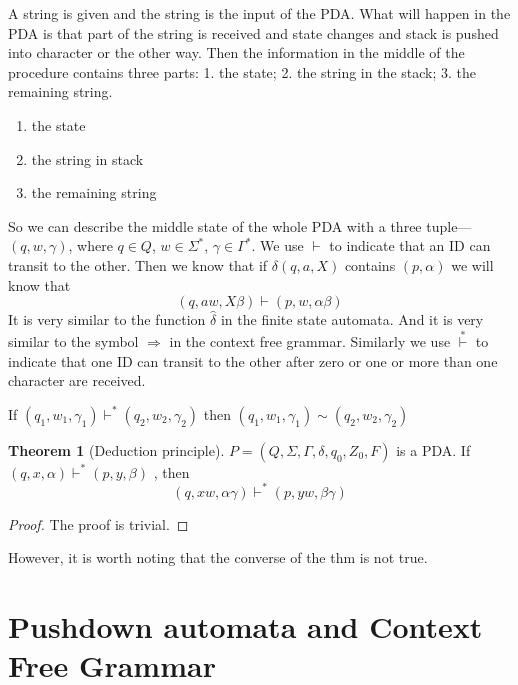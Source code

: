 \documentclass[12pt]{article}
\theoremstyle{definition}
\newtheorem{thm}[definition]{Theorem}
\theoremstyle{remark}
\begin{document}
A string is given and the string is the
input of the PDA. What will happen in the PDA is that part of
the string is received and state changes and stack is pushed into
character or the other way. Then the information in the middle of
the procedure contains three parts: 1. the state; 2. the string in
the stack; 3. the remaining string.
\begin{enumerate}
\item the state
\item the string in stack
\item the remaining string
\end{enumerate}
So we can describe the middle state of the whole PDA with a three
tuple---\((q, w ,\gamma)\), where \(q \in Q\), \( w\in \Sigma ^{*} \), \(\gamma \in \Gamma ^{*}\). We use \(\vdash\) to indicate that
an ID can transit to the other. Then we know that if \(\delta (q , a , X )\) contains \( ( p ,\alpha)\) we will know that
\[
	(q , a w , X\beta ) \vdash ( p , w ,\alpha \beta )
\]
It is very similar to the function \( \hat\delta\) in the finite state automata. And it is very similar to the symbol \( \Rightarrow\)
in the context free grammar.   Similarly we use \( \overset{*}{\vdash}\) to indicate that one ID can transit to the other after zero or one or more
than one character are received.

If \((q_{1} , w_{1} ,\gamma _{1}) \vdash ^{*} (q_{2}, w_2,\gamma_2)\) then
\((q_{1} , w_{1} ,\gamma _{1}) \sim (q_{2}, w_2,\gamma_2)\)


\begin{thm}[Deduction principle]
\label{Deduction principle}
	\(P  = ( Q , \Sigma , \Gamma ,\delta , q _{0}, Z _{0}, F)\)
	is a PDA. If \((q , x ,\alpha )\vdash ^{*} ( p, y  ,\beta)\) , then
	\[
		(q,  x w ,\alpha \gamma ) \vdash ^{*} (p , y w, \beta \gamma)
	\]
\end{thm}

\begin{proof}
The proof is trivial.
\end{proof}
However, it is worth noting that the converse of the thm is not
true.


\section{Pushdown automata and Context Free Grammar}
\label{sec:Pushdown automata and Context Free Grammar}
\end{document}
